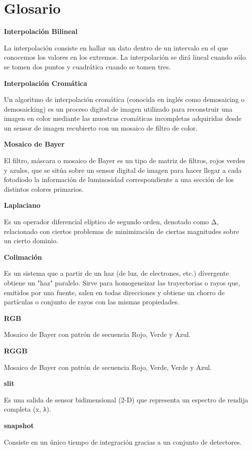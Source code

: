 \chapter{Glosario} %

\textbf{Interpolación Bilineal}

La interpolación consiste en hallar un dato dentro de un intervalo en el que conocemos los valores en los extremos. La interpolación se dirá lineal cuando sólo se tomen dos puntos y cuadrática cuando se tomen tres.

\textbf{Interpolación Cromática}

Un algoritmo de interpolación cromática (conocida en inglés como demosaicing o demosaicking) es un proceso digital de imagen utilizado para reconstruir una imagen en color mediante las muestras cromáticas incompletas adquiridas desde un sensor de imagen recubierto con un mosaico de filtro de color.

\textbf{Mosaico de Bayer}

El filtro, máscara o mosaico de Bayer es un tipo de matriz de filtros, rojos verdes y azules, que se sitúa sobre un sensor digital de imagen para hacer llegar a cada fotodiodo la información de luminosidad correspondiente a una sección de los distintos colores primarios.

\textbf{Laplaciano}

 Es un operador diferencial elíptico de segundo orden, denotado como Δ, relacionado con ciertos problemas de minimización de ciertas magnitudes sobre un cierto dominio.

\textbf{Colimación}

Es un sistema que a partir de un haz (de luz, de electrones, etc.) divergente obtiene un "haz" paralelo. Sirve para homogeneizar las trayectorias o rayos que, emitidos por una fuente, salen en todas direcciones y obtiene un chorro de partículas o conjunto de rayos con las mismas propiedades.

\textbf{RGB}

Mosaico de Bayer con patrón de secuencia Rojo, Verde y Azul.

\textbf{RGGB}

Mosaico de Bayer con patrón de secuencia Rojo, Verde, Verde y Azul.

\textbf{slit}

Es una salida de sensor bidimensional (2-D) que representa un espectro de rendija completa (x, λ).

\textbf{snapshot}

Consiste en un único tiempo de integración gracias a un conjunto de detectores.
